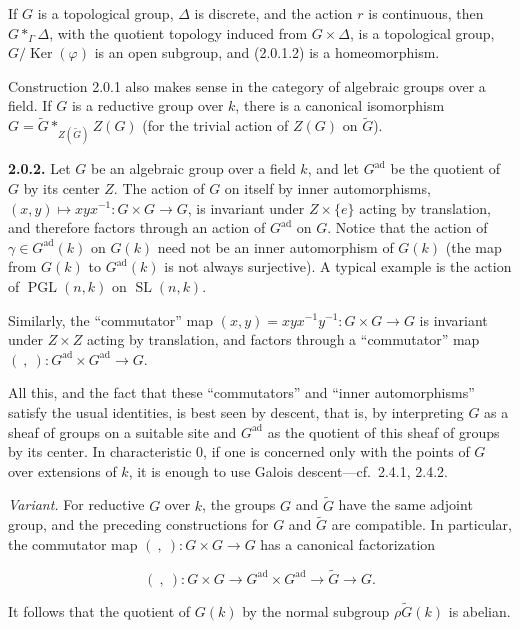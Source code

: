\documentclass[10pt,a4paper]{article}
\newcommand{\SourcePage}[2]{\clearpage\setcounter{page}{#2}\typeout{D031_SOURCE_PAGE physical=#1 printed=#2}}
\begin{document}
If \(G\) is a topological group, \(\Delta\) is discrete, and the action \(r\) is continuous, then \(G*_{\Gamma}\Delta\), with the quotient topology induced from \(G\times\Delta\), is a topological group, \(G/\operatorname{Ker}(\varphi)\) is an open subgroup, and (2.0.1.2) is a homeomorphism.

Construction 2.0.1 also makes sense in the category of algebraic groups over a field. If \(G\) is a reductive group over \(k\), there is a canonical isomorphism \(G=\widetilde G*_{Z(\widetilde G)}Z(G)\) (for the trivial action of \(Z(G)\) on \(\widetilde G\)).

\textbf{2.0.2.} Let \(G\) be an algebraic group over a field \(k\), and let \(G^{\mathrm{ad}}\) be the quotient of \(G\) by its center \(Z\). The action of \(G\) on itself by inner automorphisms, \((x,y)\mapsto xyx^{-1}:G\times G\to G\), is invariant under \(Z\times\{e\}\) acting by translation, and therefore factors through an action of \(G^{\mathrm{ad}}\) on \(G\). Notice that the action of \(\gamma\in G^{\mathrm{ad}}(k)\) on \(G(k)\) need not be an inner automorphism of \(G(k)\) (the map from \(G(k)\) to \(G^{\mathrm{ad}}(k)\) is not always surjective). A typical example is the action of \(\operatorname{PGL}(n,k)\) on \(\operatorname{SL}(n,k)\).

Similarly, the ``commutator'' map \((x,y)=xyx^{-1}y^{-1}:G\times G\to G\) is invariant under \(Z\times Z\) acting by translation, and factors through a ``commutator'' map \((\ ,\ ):G^{\mathrm{ad}}\times G^{\mathrm{ad}}\to G\).

\SourcePage{17}{263}
All this, and the fact that these ``commutators'' and ``inner automorphisms'' satisfy the usual identities, is best seen by descent, that is, by interpreting \(G\) as a sheaf of groups on a suitable site and \(G^{\mathrm{ad}}\) as the quotient of this sheaf of groups by its center. In characteristic 0, if one is concerned only with the points of \(G\) over extensions of \(k\), it is enough to use Galois descent---cf.~2.4.1, 2.4.2.

\emph{Variant.} For reductive \(G\) over \(k\), the groups \(G\) and \(\widetilde G\) have the same adjoint group, and the preceding constructions for \(G\) and \(\widetilde G\) are compatible. In particular, the commutator map \((\ ,\ ):G\times G\to G\) has a canonical factorization

\[
(\ ,\ ):G\times G\longrightarrow G^{\mathrm{ad}}\times G^{\mathrm{ad}}\longrightarrow\widetilde G\longrightarrow G.
\]

It follows that the quotient of \(G(k)\) by the normal subgroup \(\rho\widetilde G(k)\) is abelian.
\end{document}
